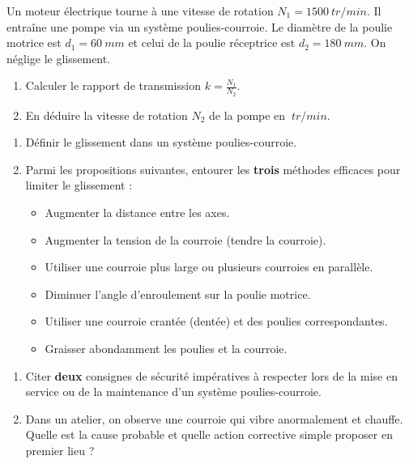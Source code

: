 \documentclass[11pt]{article}
\begin{document}
\begin{exercice}
Un moteur électrique tourne à une vitesse de rotation $N_1 = \SI{1500}{tr/min}$. Il entraîne une pompe via un système poulies-courroie. Le diamètre de la poulie motrice est $d_1 = \SI{60}{mm}$ et celui de la poulie réceptrice est $d_2 = \SI{180}{mm}$. On néglige le glissement.
\begin{enumerate}
    \item Calculer le rapport de transmission $k = \frac{N_1}{N_2}$.
    \item En déduire la vitesse de rotation $N_2$ de la pompe en $\SI{}{tr/min}$.
\end{enumerate}
\end{exercice}

\begin{exercice}
\begin{enumerate}
    \item Définir le glissement dans un système poulies-courroie.
    \item Parmi les propositions suivantes, entourer les \textbf{trois} méthodes efficaces pour limiter le glissement :
    \begin{itemize}
        \item Augmenter la distance entre les axes.
        \item Augmenter la tension de la courroie (tendre la courroie).
        \item Utiliser une courroie plus large ou plusieurs courroies en parallèle.
        \item Diminuer l'angle d'enroulement sur la poulie motrice.
        \item Utiliser une courroie crantée (dentée) et des poulies correspondantes.
        \item Graisser abondamment les poulies et la courroie.
    \end{itemize}
\end{enumerate}
\end{exercice}

\begin{exercice}
\begin{enumerate}
    \item Citer \textbf{deux} consignes de sécurité impératives à respecter lors de la mise en service ou de la maintenance d'un système poulies-courroie.
    \item Dans un atelier, on observe une courroie qui vibre anormalement et chauffe. Quelle est la cause probable et quelle action corrective simple proposer en premier lieu ?
\end{enumerate}
\end{exercice}
\end{document}
